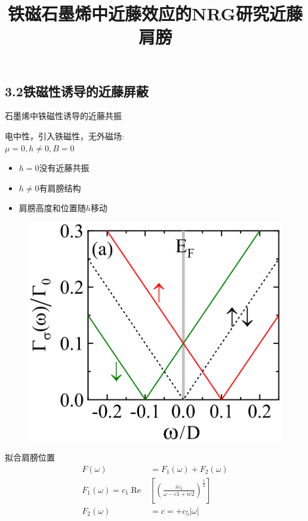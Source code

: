 \documentclass[9pt,t]{beamer} %
\begin{document}
\subsection{3.2铁磁性诱导的近藤屏蔽}
\title{铁磁石墨烯中近藤效应的NRG研究\qquad \qquad \qquad \qquad 近藤肩膀}
\begin{frame}{石墨烯中铁磁性诱导的近藤共振}
\begin{minipage}[t]{0.55 \textwidth}
\begin{minipage}[t]{0.65 \textwidth}
电中性，引入铁磁性，无外磁场:\\
\text{ } \quad $\mu=0, h\neq 0, B=0$
\begin{itemize}
\item $h=0$没有近藤共振
\item $h\neq 0$有肩膀结构
\item 肩膀高度和位置随$h$移动
\end{itemize}
\end{minipage}%
\begin{minipage}[t]{0.45 \textwidth}
\begin{figure}
\includegraphics[width=\textwidth]{hyb1.png}
\end{figure}
\end{minipage}
\vspace{-0.4cm}
拟合肩膀位置
\vspace{-0.2cm}
\begin{equation}\nonumber
\begin{aligned} F(\omega) &=F_{1}(\omega)+F_{2}(\omega) \\ F_{1}(\omega)=c_{1} \operatorname{Re} &\left[\left(\frac{i c_{3}}{\omega-c 1+i c 2}\right)^{\frac{1}{2}}\right] \\ F_{2}(\omega) &=c=+c_{5}|\omega| \end{aligned}

\end{equation}
\end{minipage}
\end{frame}
\end{document}
